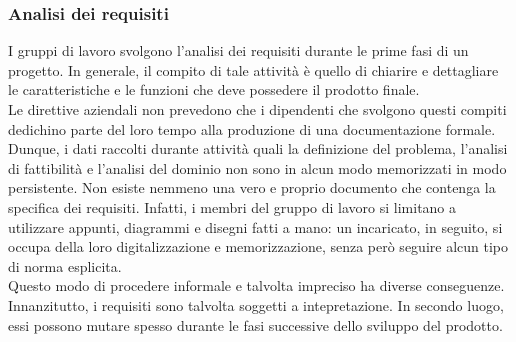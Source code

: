 			\subsubsection{Analisi dei requisiti}
				I gruppi di lavoro svolgono l'analisi dei requisiti durante le prime fasi di un progetto. In generale, il compito di
				tale attività è quello di chiarire e dettagliare le caratteristiche e le funzioni che deve possedere il prodotto
				finale.\\
				Le direttive aziendali non prevedono che i dipendenti che svolgono questi compiti dedichino parte del loro tempo alla
				produzione di una documentazione formale. Dunque, i dati raccolti durante attività quali la definizione del
				problema, l'analisi di fattibilità e l'analisi del dominio non sono in alcun modo memorizzati in modo persistente.
				Non esiste nemmeno una vero e proprio documento che contenga la specifica dei requisiti. Infatti, i membri del
				gruppo di lavoro si limitano a utilizzare appunti, diagrammi e disegni fatti a mano: un incaricato, in seguito, si
				occupa della loro digitalizzazione e memorizzazione, senza però seguire alcun tipo di norma esplicita.\\
				Questo modo di procedere informale e talvolta impreciso ha diverse conseguenze. Innanzitutto, i requisiti sono 
				talvolta soggetti a intepretazione. In secondo luogo, essi possono mutare spesso durante le fasi successive dello
				sviluppo del prodotto.
